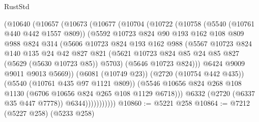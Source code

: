 \begin{lexlean}{RustStd}
\begin{coremodule}
                (@10640
                  (@10657
                    (@10673
                      (@10677
                        (@10704
                          (@10722
                            (@10758
                              (@5540 (@10761 @440 @442 @1557 @809))
                              (@5592
                                @10723
                                @824
                                @90
                                @193
                                @162
                                @108
                                @809
                                @988
                                @824
                                @314
                                (@5606
                                  @10723
                                  @824
                                  @193
                                  @162
                                  @988
                                  (@5567
                                    @10723
                                    @824
                                    @140
                                    @135
                                    @24
                                    @42
                                    @827
                                    @821
                                    (@5621
                                      @10723
                                      @824
                                      @85
                                      @24
                                      @85
                                      @827
                                      (@5629 (@5630 @10723 @85))
                                      @5703)
                                    (@5646 @10723 @824)))
                                @6424
                                @9009
                                @9011
                                @9013
                                @5669))
                            (@6081 (@10749 @23))
                            (@2720 (@10754 @442 @435))
                            (@5540 (@10761 @435 @97 @1121 @809))
                            (@5546
                              @10656
                              @824
                              @268
                              @108
                              @1130
                              (@6706 @10656 @824 @265 @108 @1129 @6718)))
                          @6332
                          (@2720 (@6337 @35 @447 @7778))
                          @6344)))))))))))
@10860 := @5221 @258
@10864 := @7212 (@5227 @258) (@5233 @258)

\end{coremodule}
\end{lexlean}
